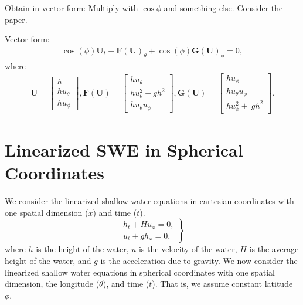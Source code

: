 Obtain in vector form:
Multiply with $\cos \phi$ and something else. Consider the paper.

Vector form:
\begin{align}
    \cos(\phi) \mathbf{U}_t + \mathbf{F(U)}_\theta + \cos(\phi) \mathbf{G(U)}_\phi = 0,
\end{align}
where 
\begin{align*}
    \mathbf{U} = \begin{bmatrix} h \\ h u_\theta \\h u_\phi \end{bmatrix},
    \mathbf{F(U)} = \begin{bmatrix} h u_\theta \\ h u_\theta^2 + g h^2  \\ h u_\theta u_\phi \end{bmatrix},
    \mathbf{G(U)} = \begin{bmatrix} h u_\phi \\ h u_\theta u_\phi \\ h u_\phi^2 + \ g h^2 \end{bmatrix}.
\end{align*}



\section{Linearized SWE in Spherical Coordinates}
We consider the linearized shallow water equations in cartesian coordinates with one spatial dimension ($x$) and time ($t$).
\begin{equation}
    \left.
    \begin{aligned}
        h_t + H u_x = 0, \\
        u_t + g h_x = 0,
    \end{aligned}
    \right\}
\end{equation}
where $h$ is the height of the water, $u$ is the velocity of the water, $H$ is the average height of the water, and $g$ is the acceleration due to gravity.
We now consider the linearized shallow water equations in spherical coordinates with one spatial dimension, the longitude ($\theta$), and time ($t$).
That is, we assume constant latitude $\phi$. 

